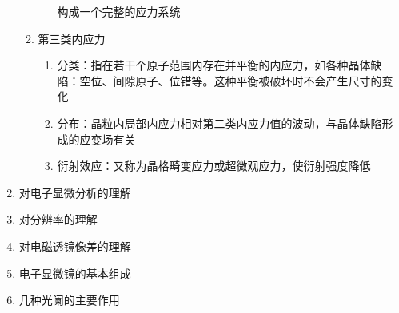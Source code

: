 \documentclass[12pt,a4paper]{article}
\begin{document}
\begin{enumerate}
\begin{enumerate}
\begin{enumerate}
                构成一个完整的应力系统
            \end{enumerate}
            \item 第三类内应力
            \begin{enumerate}
                \item 分类：指在若干个原子范围内存在并平衡的内应力，如各种晶体缺陷：空位、间隙原子、位错等。这种平衡被破坏时不会产生尺寸的变化
                \item 分布：晶粒内局部内应力相对第二类内应力值的波动，与晶体缺陷形成的应变场有关
                \item 衍射效应：又称为晶格畸变应力或超微观应力，使衍射强度降低
            \end{enumerate}
        \end{enumerate}
        \item 对电子显微分析的理解
        \item 对分辨率的理解
        \item 对电磁透镜像差的理解
        \item 电子显微镜的基本组成
        \item 几种光阑的主要作用
    \end{enumerate}

    
\end{document}
